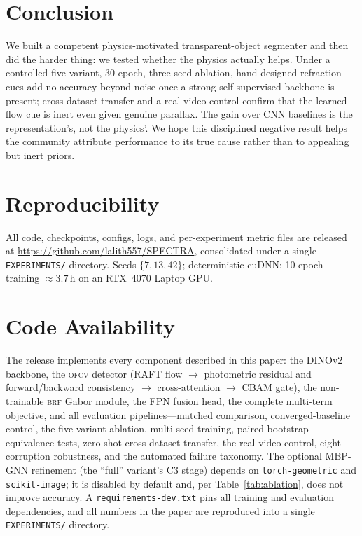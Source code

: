 \documentclass{article}
\newcommand{\ofcv}{\textsc{ofcv}}
\newcommand{\brf}{\textsc{brf}}
\newcommand{\dinov}{DINOv2}
\begin{document}
\section{Conclusion}
We built a competent physics-motivated transparent-object segmenter and then did
the harder thing: we tested whether the physics actually helps. Under a
controlled five-variant, 30-epoch, three-seed ablation, hand-designed refraction
cues add no accuracy beyond noise once a strong self-supervised backbone is
present; cross-dataset transfer and a real-video control confirm that the
learned flow cue is inert even given genuine parallax. The gain over CNN
baselines is the representation's, not the physics'. We hope this disciplined
negative result helps the community attribute performance to its true cause
rather than to appealing but inert priors.

\section*{Reproducibility}
All code, checkpoints, configs, logs, and per-experiment metric files are
released at \url{https://github.com/lalith557/SPECTRA}, consolidated under a
single \texttt{EXPERIMENTS/} directory.%
Seeds $\{7,13,42\}$; deterministic cuDNN; 10-epoch training ${\approx}3.7$\,h on
an RTX~4070 Laptop GPU.

\section*{Code Availability}
The release implements every component described in this paper: the \dinov{}
backbone, the \ofcv{} detector (RAFT flow $\rightarrow$ photometric residual and
forward/backward consistency $\rightarrow$ cross-attention $\rightarrow$ CBAM
gate), the non-trainable \brf{} Gabor module, the FPN fusion head, the complete
multi-term objective, and all evaluation pipelines---matched comparison,
converged-baseline control, the five-variant ablation, multi-seed training,
paired-bootstrap equivalence tests, zero-shot cross-dataset transfer, the
real-video control, eight-corruption robustness, and the automated failure
taxonomy. The optional MBP-GNN refinement (the ``full'' variant's C3 stage)
depends on \texttt{torch-geometric} and \texttt{scikit-image}; it is disabled by
default and, per Table~\ref{tab:ablation}, does not improve accuracy. A
\texttt{requirements-dev.txt} pins all training and evaluation dependencies, and
all numbers in the paper are reproduced into a single \texttt{EXPERIMENTS/}
directory.
\end{document}
